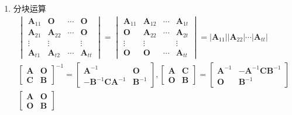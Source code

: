 \documentclass[12pt]{book}
\begin{document}
\begin{enumerate}[1.]
    \item 分块运算
          \begin{gather*}
              \begin{vmatrix}
                  \bm{A}_{11} & \bm{O}      & \cdots & \bm{O}      \\
                  \bm{A}_{21} & \bm{A}_{22} & \cdots & \bm{O}      \\
                  \vdots      & \vdots      &        & \vdots      \\
                  \bm{A}_{t1} & \bm{A}_{t2} & \cdots & \bm{A}_{tt}
              \end{vmatrix}
              = \begin{vmatrix}
                  \bm{A}_{11} & \bm{A}_{12} & \cdots & \bm{A}_{1t} \\
                  \bm{O}      & \bm{A}_{22} & \cdots & \bm{A}_{2t} \\
                  \vdots      & \vdots      &        & \vdots      \\
                  \bm{O}      & \bm{O}      & \cdots & \bm{A}_{tt}
              \end{vmatrix}
              = |\bm{A}_{11}| |\bm{A}_{22}| \cdots |\bm{A}_{tt}| \\
              \begin{bmatrix}
                  \bm{A} & \bm{O} \\
                  \bm{C} & \bm{B}
              \end{bmatrix}^{-1}
              =\begin{bmatrix}
                  \bm{A}^{-1}                   & \bm{O}      \\
                  -\bm{B}^{-1}\bm{C}\bm{A}^{-1} & \bm{B}^{-1}
              \end{bmatrix},
              \begin{bmatrix}
                  \bm{A} & \bm{C} \\
                  \bm{O} & \bm{B}
              \end{bmatrix}
              =\begin{bmatrix}
                  \bm{A}^{-1} & -\bm{A}^{-1}\bm{C}\bm{B}^{-1} \\
                  \bm{O}      & \bm{B}^{-1}
              \end{bmatrix}\\
              \begin{bmatrix}
                  \bm{A} & \bm{O} \\
                  \bm{O} & \bm{B}

\end{bmatrix}
\end{gather*}
\end{enumerate}
\end{document}
